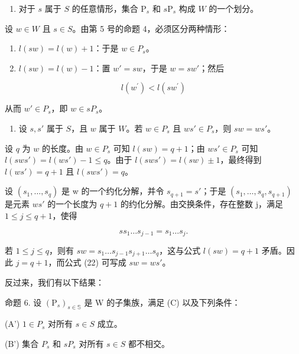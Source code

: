 \begin{enumerate}
\def\labelenumi{(\Alph{enumi})}
\setcounter{enumi}{1}
\tightlist
\item
  对于 \(s\) 属于 \(S\) 的任意情形，集合 \(\mathrm{P}_s\) 和 \(s\mathrm{P}_s\) 构成 \(W\) 的一个划分。
\end{enumerate}

设 \(w \in W\) 且 \(s \in S\)。由第 5 号的命题 4，必须区分两种情形：

\begin{enumerate}
\def\labelenumi{\alph{enumi})}
\item
  \(l(sw) = l(w) + 1\)：于是 \(w \in P_s\)。
\item
  \(l(sw) = l(w) - 1\)：置 \(w' = sw\)，于是 \(w = sw'\)；然后
\end{enumerate}

\[
l (w ^ {\prime}) <   l (s w ^ {\prime})
\]

从而 \(w' \in P_s\)，即 \(w \in sP_s\)。

\begin{enumerate}
\def\labelenumi{(\Alph{enumi})}
\setcounter{enumi}{2}
\tightlist
\item
  设 \(s, s'\) 属于 \(S\)，且 \(w\) 属于 \(W\)。若 \(w \in P_s\) 且 \(ws' \in P_s\)，则 \(sw = ws'\)。
\end{enumerate}

设 \(q\) 为 \(w\) 的长度。由 \(w \in P_s\) 可知 \(l(sw) = q + 1\)；由 \(ws' \in P_s\) 可知 \(l(sws') = l(ws') - 1 \leqslant q\)。由于 \(l(sws') = l(sw) \pm 1\)，最终得到 \(l(ws') = q + 1\) 且 \(l(sws') = q\)。

设 \((s_{1},\ldots,s_{q})\) 是 w 的一个约化分解，并令 \(s_{q+1}=s'\)；于是 \((s_{1},\ldots,s_{q},s_{q+1})\) 是元素 \(ws'\) 的一个长度为 \(q+1\) 的约化分解。由交换条件，存在整数 j，满足 \(1\leqslant j\leqslant q+1\)，使得

\[
s s _ {1} \dots s _ {j - 1} = s _ {1} \dots s _ {j}.\tag{22}
\]

若 \(1 \leqslant j \leqslant q\)，则有 \(sw = s_1 \ldots s_{j-1}s_{j+1} \ldots s_q\)，这与公式 \(l(sw) = q + 1\) 矛盾。因此 \(j = q + 1\)，而公式 (22) 可写成 \(sw = ws'\)。

反过来，我们有以下结果：

命题 6. 设 \((\mathrm{P}_s)_{s\in \mathbb{S}}\) 是 W 的子集族，满足 (C) 以及下列条件：

(A') \(1 \in P_{s}\) 对所有 \(s \in S\) 成立。

(B') 集合 \(P_{s}\) 和 \(sP_{s}\) 对所有 \(s \in S\) 都不相交。

